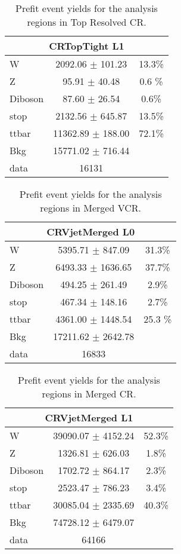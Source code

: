 \begin{table}
\caption{Prefit event yields for the analysis regions in Top Resolved CR.}
\label{tab:PrefitYield_TCRRes_Per}
\begin{center}
\begin{tabular}{|l|c| c|}
\hline
\multicolumn{3}{|c|}{CRTopTight L1}\\ \hline
W & 2092.06 $\pm$ 101.23 & 13.3\% \\
Z & 95.91 $\pm$ 40.48 & 0.6 \% \\
Diboson & 87.60 $\pm$ 26.54 & 0.6\%  \\
stop & 2132.56 $\pm$ 645.87 & 13.5\% \\
ttbar & 11362.89 $\pm$ 188.00 & 72.1\%\\
\hline
Bkg & 15771.02 $\pm$ 716.44 & \\
\hline
data & 16131 & \\ \hline
\end{tabular}
\end{center}
\end{table}


\begin{table}
\caption{Prefit event yields for the analysis regions in Merged VCR.}
\label{tab:PrefitYield_VCRMer_Per}
\begin{center}
\begin{tabular}{|l|c|c|}
\hline
\multicolumn{3}{|c|}{CRVjetMerged L0}\\ \hline
W & 5395.71 $\pm$ 847.09 & 31.3\% \\
Z & 6493.33 $\pm$ 1636.65 & 37.7\% \\
Diboson & 494.25 $\pm$ 261.49 & 2.9\% \\
stop & 467.34 $\pm$ 148.16 & 2.7\% \\
ttbar & 4361.00 $\pm$ 1448.54 & 25.3 \% \\
\hline
Bkg & 17211.62 $\pm$ 2642.78 & \\
\hline
data & 16833 & \\ \hline
\end{tabular}
\end{center}
\end{table}

\begin{table}
\caption{Prefit event yields for the analysis regions in \Wjets Merged CR.}
\label{tab:PrefitYield_WCRMer_Per}
\begin{center}
\begin{tabular}{|l|c|c|}
\hline
\multicolumn{3}{|c|}{CRVjetMerged L1}\\ \hline
W & 39090.07 $\pm$ 4152.24 & 52.3\% \\
Z & 1326.81 $\pm$ 626.03 & 1.8\% \\
Diboson & 1702.72 $\pm$ 864.17 & 2.3\%\\
stop & 2523.47 $\pm$ 786.23 & 3.4\% \\
ttbar & 30085.04 $\pm$ 2335.69 & 40.3\% \\
\hline
Bkg & 74728.12 $\pm$ 6479.07 & \\
\hline
data & 64166 & \\ \hline
\end{tabular}
\end{center}
\end{table}

